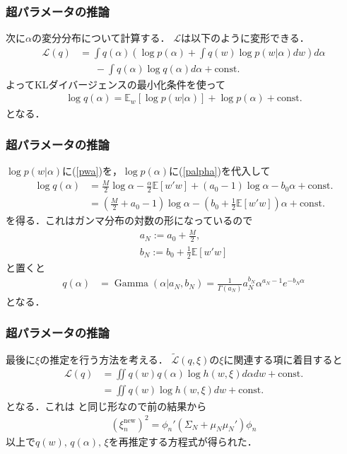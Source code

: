 \documentclass[10pt,hyperref={unicode}]{beamer}
\DeclareMathOperator*{\GammaDistribution}{Gamma}
\newcommand{\paref}[1]{{\fontfamily{cmr}\selectfont (\ref{#1})}}
\newcommand{\parentheses}[1]{\left(#1\right)}
\newcommand{\brackets}[1]{\left[#1\right]}
\newcommand{\const}{\mathrm{const.}}
\newcommand{\energy}{\mathcal{L}}
\begin{document}
\begin{frame}
\frametitle{超パラメータの推論}
次に$\alpha$の変分分布について計算する．
$\energy$は以下のように変形できる．
\begin{align*}
    \energy\parentheses{q}
    &= \int q\parentheses{\alpha}\parentheses{\log p\parentheses{\alpha} + \int q\parentheses{w} \log p\parentheses{w|\alpha} dw} d\alpha \\
    &\phantom{=}\ -\int q\parentheses{\alpha} \log q\parentheses{\alpha} d\alpha + \const
\end{align*}
よってKLダイバージェンスの最小化条件を使って
\begin{align*}
    \log q\parentheses{\alpha} = \mathbb{E}_w \brackets{\log p\parentheses{w|\alpha}} + \log p\parentheses{\alpha} + \const
\end{align*}
となる．
\end{frame}

\begin{frame}
\frametitle{超パラメータの推論}
$\log p\parentheses{w|\alpha}$に\paref{pwa}を，$\log p\parentheses{\alpha}$に\paref{palpha}を代入して
\begin{align*}
    \log q\parentheses{\alpha}
    &= \frac{M}{2}\log \alpha - \frac{\alpha}{2}\mathbb{E}\brackets{w'w} +\parentheses{a_0 - 1}\log \alpha - b_0\alpha + \const \\
    &= \parentheses{\frac{M}{2} + a_0 - 1}\log \alpha - \parentheses{b_0 + \frac{1}{2}\mathbb{E}\brackets{w'w}}\alpha + \const
\end{align*}
を得る．これはガンマ分布の対数の形になっているので
\begin{gather}
    a_N := a_0 + \frac{M}{2}, \tag{10.178} \\
    b_N := b_0 + \frac{1}{2}\mathbb{E}\brackets{w'w} \tag{10.179}
\end{gather}
と置くと
\begin{align}
    q\parentheses{\alpha} &= \GammaDistribution\parentheses{\alpha | a_N,b_N} = \frac{1}{\varGamma\parentheses{a_N}}a_N^{b_N}\alpha^{a_N - 1}e^{-b_N\alpha} \tag{10.177}
\end{align}
となる．
\end{frame}

\begin{frame}
\frametitle{超パラメータの推論}
最後に$\xi$の推定を行う方法を考える．
$\widetilde{\energy}\parentheses{q,\xi}$の$\xi$に関連する項に着目すると
\begin{align*}
    \energy\parentheses{q}
    &= \iint q\parentheses{w}q\parentheses{\alpha} \log h\parentheses{w,\xi} d\alpha dw + \const \\
    &= \iint q\parentheses{w} \log h\parentheses{w,\xi} dw + \const
\end{align*}
となる．これは
と同じ形なので前の結果から
\begin{align}
    \parentheses{\xi_n^{\mathrm{new}}}^2 = \phi_n'\parentheses{\varSigma_N + \mu_N\mu_N'}\phi_n \tag{10.181}
\end{align}
以上で$q\parentheses{w},\,q\parentheses{\alpha},\,\xi$を再推定する方程式が得られた．
\end{frame}
\end{document}
